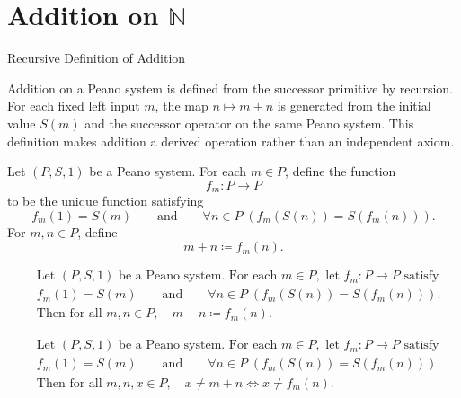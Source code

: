 \section{Addition on \texorpdfstring{$\mathbb{N}$}{N}}

\begin{topicbox}{Recursive Definition of Addition}
\begin{exposition}
Addition on a Peano system is defined from the successor primitive by
recursion. For each fixed left input $m$, the map $n \mapsto m+n$ is generated
from the initial value $S(m)$ and the successor operator on the same Peano
system. This definition makes addition a derived operation rather than an
independent axiom.
\end{exposition}

\begin{tcolorbox}[colback=defbox, colframe=defborder, arc=2pt,
  left=6pt, right=6pt, top=4pt, bottom=4pt,
  title={\small\textbf{Definition (Addition on a Peano System)}},
  fonttitle=\small\bfseries]
\begin{definition}
\label{def:addition-on-peano-system}
Let $(P,S,1)$ be a Peano system. For each $m \in P$, define the function
\[
f_m : P \to P
\]
to be the unique function satisfying
\[
f_m(1)=S(m)
\qquad\text{and}\qquad
\forall n \in P\;(f_m(S(n))=S(f_m(n))).
\]
For $m,n \in P$, define
\[
m+n \coloneqq f_m(n).
\]
\end{definition}
\end{tcolorbox}

\begin{remark*}
\[
\begin{aligned}
&\text{Let } (P,S,1) \text{ be a Peano system. For each } m \in P,
\text{ let } f_m : P \to P \text{ satisfy}\\
&f_m(1)=S(m)
\qquad\text{and}\qquad
\forall n \in P\;(f_m(S(n))=S(f_m(n))).\\
&\text{Then for all } m,n \in P,\quad m+n \coloneqq f_m(n).
\end{aligned}
\]
\end{remark*}

\begin{remark*}
\[
\begin{aligned}
&\text{Let } (P,S,1) \text{ be a Peano system. For each } m \in P,
\text{ let } f_m : P \to P \text{ satisfy}\\
&f_m(1)=S(m)
\qquad\text{and}\qquad
\forall n \in P\;(f_m(S(n))=S(f_m(n))).\\
&\text{Then for all } m,n,x \in P,\quad x \neq m+n
\Longleftrightarrow
x \neq f_m(n).
\end{aligned}
\]
\end{remark*}


\end{topicbox}

